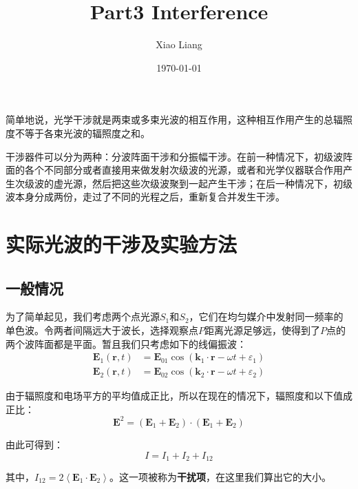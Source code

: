 \documentclass[UTF8]{ctexart}
\title{Part3 Interference}
\author{Xiao Liang}
\date{\today}
\begin{document}
	\maketitle
	\tableofcontents
	\newpage
	简单地说，光学干涉就是两束或多束光波的相互作用，这种相互作用产生的总辐照度不等于各束光波的辐照度之和。
	
	干涉器件可以分为两种：分波阵面干涉和分振幅干涉。在前一种情况下，初级波阵面的各个不同部分或者直接用来做发射次级波的光源，或者和光学仪器联合作用产生次级波的虚光源，然后把这些次级波聚到一起产生干涉；在后一种情况下，初级波本身分成两份，走过了不同的光程之后，重新复合并发生干涉。
	
	\section{实际光波的干涉及实验方法}
	
	\subsection{一般情况}
	为了简单起见，我们考虑两个点光源$S_{1}$和$S_{2}$，它们在均匀媒介中发射同一频率的单色波。令两者间隔远大于波长，选择观察点$P$距离光源足够远，使得到了$P$点的两个波阵面都是平面。暂且我们只考虑如下的线偏振波：
	\begin{equation}
	\begin{aligned}
	\mathbf{E}_{1}(\mathbf{r}, t)&=\mathbf{E}_{01} \cos \left(\mathbf{k}_{1} \cdot \mathbf{r}-\omega t+\varepsilon_{1}\right)\\	
	\mathbf{E}_{2}(\mathbf{r}, t)&=\mathbf{E}_{02} \cos \left(\mathbf{k}_{2} \cdot \mathbf{r}-\omega t+\varepsilon_{2}\right)
	\end{aligned}
	\end{equation}
	
	由于辐照度和电场平方的平均值成正比，所以在现在的情况下，辐照度和以下值成正比：
	\begin{equation}
	\mathbf{E}^{2}=\left(\mathbf{E}_{1}+\mathbf{E}_{2}\right) \cdot\left(\mathbf{E}_{1}+\mathbf{E}_{2}\right)
	\end{equation}
	
	由此可得到：
	\begin{equation}
	I=I_{1}+I_{2}+I_{12}
	\end{equation}
	
	\noindent 其中，$I_{12}=2\left\langle\mathbf{E}_{1} \cdot \mathbf{E}_{2}\right\rangle$。这一项被称为\textbf{干扰项}，在这里我们算出它的大小。
	
\end{document}
